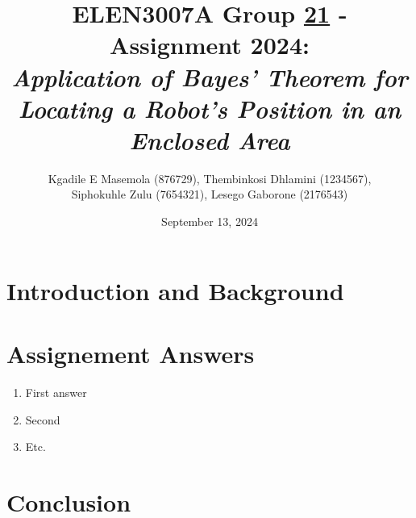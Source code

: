 \documentclass[a4paper,11pt]{article}
\title{ELEN3007A Group \underline{21} - Assignment 2024: \\ 
\large \emph{Application of Bayes’ Theorem for Locating a Robot’s
Position in an Enclosed Area}}
\author{Kgadile E Masemola (876729),  Thembinkosi Dhlamini (1234567),
 \\Siphokuhle Zulu (7654321), Lesego Gaborone (2176543)}
\date{September 13, 2024}
\begin{document}
\maketitle

\section*{Introduction and Background}

\section*{Assignement Answers}
\begin{enumerate}
  \item First answer
  \item Second
  \item Etc.
\end{enumerate}

\section*{Conclusion}
\end{document}
